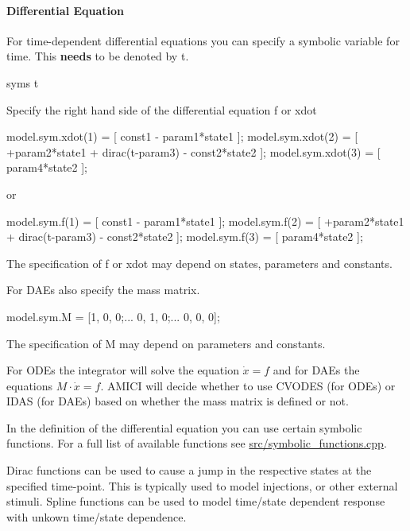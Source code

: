\paragraph*{Differential Equation}

For time-\/dependent differential equations you can specify a symbolic variable for time. This {\bfseries needs} to be denoted by {\ttfamily t}. \begin{DoxyVerb}syms t
\end{DoxyVerb}


Specify the right hand side of the differential equation {\ttfamily f} or {\ttfamily xdot} \begin{DoxyVerb}model.sym.xdot(1) = [ const1 - param1*state1 ];
model.sym.xdot(2) = [ +param2*state1 + dirac(t-param3) - const2*state2 ];
model.sym.xdot(3) = [ param4*state2 ];
\end{DoxyVerb}


or \begin{DoxyVerb}model.sym.f(1) = [ const1 - param1*state1 ];
model.sym.f(2) = [ +param2*state1 + dirac(t-param3) - const2*state2 ];
model.sym.f(3) = [ param4*state2 ];
\end{DoxyVerb}


The specification of {\ttfamily f} or {\ttfamily xdot} may depend on states, parameters and constants.

For D\+A\+Es also specify the mass matrix. \begin{DoxyVerb}model.sym.M = [1, 0, 0;...
                0, 1, 0;...
                0, 0, 0];
\end{DoxyVerb}


The specification of M may depend on parameters and constants.

For O\+D\+Es the integrator will solve the equation $ \dot{x} = f $ and for D\+A\+Es the equations $ M \cdot \dot{x} = f $. A\+M\+I\+CI will decide whether to use C\+V\+O\+D\+ES (for O\+D\+Es) or I\+D\+AS (for D\+A\+Es) based on whether the mass matrix is defined or not.

In the definition of the differential equation you can use certain symbolic functions. For a full list of available functions see {\ttfamily \mbox{\hyperlink{symbolic__functions_8cpp}{src/symbolic\+\_\+functions.\+cpp}}}.

Dirac functions can be used to cause a jump in the respective states at the specified time-\/point. This is typically used to model injections, or other external stimuli. Spline functions can be used to model time/state dependent response with unkown time/state dependence.


